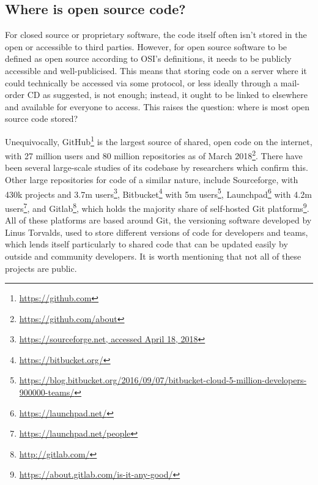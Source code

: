 
\subsection{Where is open source code?}
\label{subsec:where-is-open-source-code}

For closed source or proprietary software, the code itself often isn't stored in the open or accessible to third parties. However, for open source software to be defined as open source according to OSI's definitions, it needs to be publicly accessible and well-publicised. This means that storing code on a server where it could technically be accessed via some protocol, or less ideally through a mail-order CD as \citet{krauwer2006strengthening} suggested, is not enough; instead, it ought to be linked to elsewhere and available for everyone to access. This raises the question: where is most open source code stored?

Unequivocally, GitHub\footnote{\href{https://github.com}{https://github.com}} is the largest source of shared, open code on the internet, with 27 million users and 80 million repositories as of March 2018\footnote{\href{https://github.com/about}{https://github.com/about}}. There have been several large-scale studies of its codebase by researchers \citep{gousios2012ghtorrent, allamanis2013mining, gousios2014lean, kalliamvakou2014promises, beller2016analyzing} which confirm this. Other large repositories for code of a similar nature, include Sourceforge, with 430k projects and 3.7m users\footnote{\href{https://sourceforge.net/}{https://sourceforge.net, accessed April 18, 2018}}, Bitbucket\footnote{\href{https://bitbucket.org/}{https://bitbucket.org/}} with 5m users\footnote{\href{https://blog.bitbucket.org/2016/09/07/bitbucket-cloud-5-million-developers-900000-teams/}{https://blog.bitbucket.org/2016/09/07/bitbucket-cloud-5-million-developers-900000-teams/}},  Launchpad\footnote{\href{https://launchpad.net/}{https://launchpad.net/}} with 4.2m users\footnote{\href{https://launchpad.net/people}{https://launchpad.net/people}}, and Gitlab\footnote{\href{http://gitlab.com/}{http://gitlab.com/}}, which holds the majority share of self-hosted Git platforms\footnote{\href{https://about.gitlab.com/is-it-any-good/}{https://about.gitlab.com/is-it-any-good/}}. All of these platforms are based around Git, the versioning software developed by Linus Torvalds, used to store different versions of code for developers and teams, which lends itself particularly to shared code that can be updated easily by outside and community developers. It is worth mentioning that not all of these projects are public.

